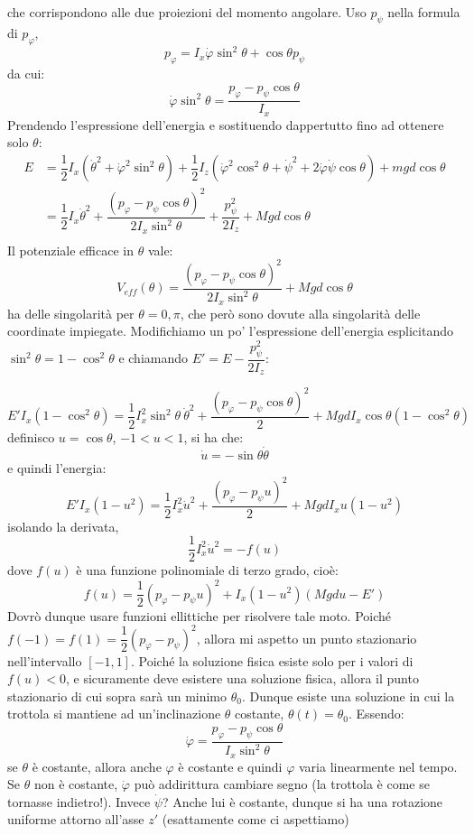 \documentclass[a4paper,openany]{article}
\begin{document}
	che corrispondono alle due proiezioni del momento angolare. Uso $p_{\psi}$ nella formula di $p_{\varphi}$, 
	$$
	p_{\varphi} = I_x \dot{\varphi}\sin^2\theta + \cos\theta p_{\psi}
	$$
	da cui:
	$$
	\dot{\varphi}\sin^2\theta = \dfrac{p_{\varphi}- p_{\psi}\cos\theta}{I_x}
	$$
	Prendendo l'espressione dell'energia e sostituendo dappertutto fino ad ottenere solo $\theta$:
	\begin{equation}\label{key}
		\begin{aligned}
			E &= \dfrac{1}{2}I_x (\dot{\theta}^{2}+ \dot{\varphi}^2\sin^{2}\theta)+\dfrac{1}{2}I_z(\dot{\varphi}^{2}\cos^{2}\theta+\dot{\psi}^{2}+2\dot{\varphi}\dot{\psi}\cos\theta) + mgd\cos\theta \\
			&= \dfrac{1}{2}I_x\dot{\theta}^{2} + \dfrac{(p_{\varphi}- p_{\psi}\cos\theta)^2}{2I_x\sin^2\theta} + \dfrac{p_{\psi}^{2}}{2I_z} + Mgd\cos\theta \\
		\end{aligned}
	\end{equation}
	Il potenziale efficace in $\theta$ vale:
	$$
	V_{eff}(\theta) = \dfrac{(p_{\varphi}- p_{\psi}\cos\theta)^2}{2I_x\sin^2\theta} + Mgd\cos\theta 
	$$
	ha delle singolarità per $\theta = 0,\pi$, che però sono dovute alla singolarità delle coordinate impiegate. Modifichiamo un po' l'espressione dell'energia esplicitando $\sin^2\theta = 1-\cos^2\theta$ e chiamando $E' = E - \dfrac{p_{\psi}^2}{2I_z}$:
	
	$$
	E'I_x(1-\cos^2\theta) = \dfrac{1}{2}I_x^{2}\sin^2\theta\>\dot{\theta}^{2}+ \dfrac{(p_{\varphi}- p_{\psi}\cos\theta)^2}{2} + MgdI_x\cos\theta(1-\cos^2\theta) 
	$$
	definisco $u = \cos\theta$, $-1<u<1$, si ha che:
	$$
	\dot{u} = -\sin\theta \dot{\theta}
	$$
	e quindi l'energia:
	$$
	E'I_x(1-u^2) = \dfrac{1}{2}I_x^{2}\dot{u}^{2}+ \dfrac{(p_{\varphi}- p_{\psi}u)^2}{2} + MgdI_x u (1-u^2) 
	$$
	isolando la derivata,
	$$
	\dfrac{1}{2}I_x^{2} \dot{u}^2 = -f(u)
	$$
	dove $f(u)$ è una funzione polinomiale di terzo grado, cioè:
	$$
	f(u) = \dfrac{1}{2}(p_{\varphi}-p_{\psi}u)^2 + I_x(1-u^2)(Mgdu - E')
	$$
	Dovrò dunque usare funzioni ellittiche per risolvere tale moto. Poiché $f(-1) = f(1) = \dfrac{1}{2}(p_{\varphi}-p_{\psi})^2$, allora mi aspetto un punto stazionario nell'intervallo $[-1,1]$. Poiché la soluzione fisica esiste solo per i valori di $f(u)<0$, e sicuramente deve esistere una soluzione fisica, allora il punto stazionario di cui sopra sarà un minimo $\theta_{0}$. Dunque esiste una soluzione in cui la trottola si mantiene ad un'inclinazione $\theta$ costante, $\theta(t) = \theta_0$. Essendo:
	\begin{equation}
		\dot{\varphi} = \dfrac{p_{\varphi}-p_{\psi}\cos\theta}{I_x \sin^2\theta}
		\label{phidot}
	\end{equation}
	se $\theta$ è costante, allora anche $\varphi$ è costante e quindi $\varphi$ varia linearmente nel tempo. Se $\theta$ non è costante, $\dot{\varphi}$ può addirittura cambiare segno (la trottola è come se tornasse indietro!). Invece $\dot{\psi}$? Anche lui è costante, dunque si ha una rotazione uniforme attorno all'asse $z'$ (esattamente come ci aspettiamo)
	
\end{document}
